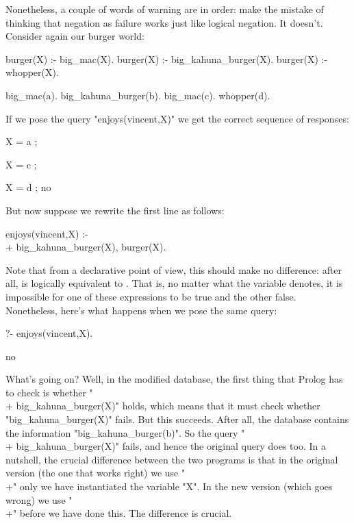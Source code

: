 Nonetheless, a couple of words of warning are in order: 
make the mistake of thinking that negation as failure works just like
logical negation.  It doesn't. Consider again our burger world:

\begin{LPNcodedisplay}
burger(X) :- big_mac(X).
burger(X) :- big_kahuna_burger(X).
burger(X) :- whopper(X).

big_mac(a).
big_kahuna_burger(b).
big_mac(c).
whopper(d).
\end{LPNcodedisplay}

If we pose the query "enjoys(vincent,X)" we get
the correct sequence of responses:
\begin{LPNcodedisplay}
X = a ;

X = c ;

X = d ;
no
\end{LPNcodedisplay}

But now suppose we rewrite the first line as follows:
\begin{LPNcodedisplay}
enjoys(vincent,X) :- \\+ big_kahuna_burger(X), burger(X).
\end{LPNcodedisplay}
Note that from a declarative point of view, this should make no
difference: after all,  is logically equivalent to .  That is, no matter what the variable
 denotes, it is impossible for one of these expressions to
be true and the other false.  Nonetheless, here's what happens
when we pose the same query:


\begin{LPNcodedisplay}
?- enjoys(vincent,X).

no
\end{LPNcodedisplay}




What's going on?  Well, in the modified database, the first thing that
Prolog has to check is whether "\\+ big\_kahuna\_burger(X)" holds,
which means that it must check whether "big\_kahuna\_burger(X)"
fails.  But this succeeds. After all, the database contains the
information "big\_kahuna\_burger(b)". So the query
"\\+ big\_kahuna\_burger(X)" fails, and hence the original query
does too.  In a nutshell, the crucial difference between the two
programs is that in the original version (the one that works right) we
use "\\+" only  we have instantiated the
variable "X".  In the new version (which goes wrong) we use
"\\+" before we have done this. The difference is crucial.

